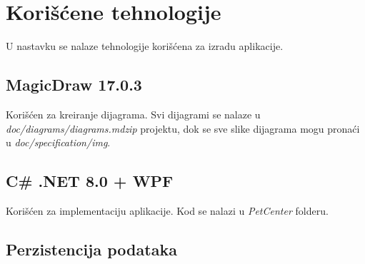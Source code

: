 \section{Korišćene tehnologije}
\par U nastavku se nalaze tehnologije korišćena za izradu aplikacije.
\subsection{MagicDraw 17.0.3}
\par Korišćen za kreiranje dijagrama. Svi dijagrami se nalaze u \textit{doc/diagrams/dia\-grams.mdzip} projektu, dok se sve slike dijagrama mogu pronaći u 
\textit{doc/spe\-cification/img}.
\subsection{C\# .NET 8.0 + WPF}
\par Korišćen za implementaciju aplikacije. Kod se nalazi u \textit{PetCenter} folderu.
\subsection{Perzistencija podataka}